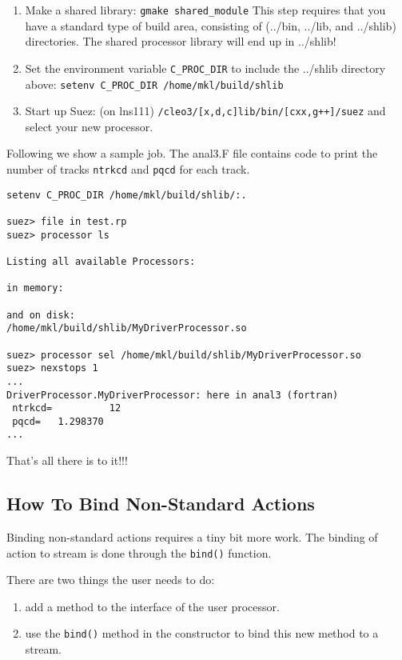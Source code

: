 \documentclass[12pt]{article}
\begin{document}
\begin{enumerate}
\item Make a shared library: \texttt{gmake shared\_module}
This step requires that you have a standard type of build area,
consisting of (../bin, ../lib, and ../shlib) directories.
The shared processor library will end up in ../shlib!

\item Set the environment variable \texttt{C\_PROC\_DIR} to include the
../shlib directory above: \texttt{setenv C\_PROC\_DIR /home/mkl/build/shlib}

\item Start up Suez: (on lns111) \texttt{/cleo3/[x,d,c]lib/bin/[cxx,g++]/suez} and
select your new processor.

\end{enumerate}

Following we show a sample job. The anal3.F file contains code to
print the number of tracks \texttt{ntrkcd} and \texttt{pqcd} for each track.
%
\begin{verbatim}
setenv C_PROC_DIR /home/mkl/build/shlib/:.

suez> file in test.rp
suez> processor ls

Listing all available Processors:

in memory:

and on disk:
/home/mkl/build/shlib/MyDriverProcessor.so

suez> processor sel /home/mkl/build/shlib/MyDriverProcessor.so
suez> nexstops 1
...
DriverProcessor.MyDriverProcessor: here in anal3 (fortran)
 ntrkcd=          12
 pqcd=   1.298370
...
\end{verbatim}

That's all there is to it!!!


\subsection{How To Bind Non-Standard Actions }
\label{sec:NonStandardActions}

Binding non-standard actions requires a tiny bit more work. The binding
of action to stream is done through the \texttt{bind()} function.

\noindent There are two things the user needs to do:
%
\begin{enumerate}
\item add a method to the interface of the user processor.
\item use the \texttt{bind()} method in the constructor to bind this new
method to a stream.
\end{enumerate}
\end{document}
